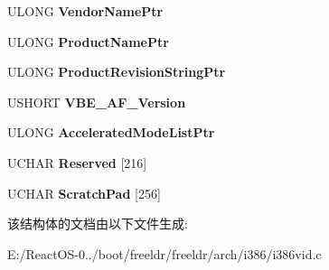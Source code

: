 \begin{DoxyCompactItemize}
U\+L\+O\+NG {\bfseries Vendor\+Name\+Ptr}
\item 
\mbox{\label{struct_v_e_s_a___s_v_g_a___i_n_f_o_a409ed8ea513bbc0b878110227179ca5a}} 
U\+L\+O\+NG {\bfseries Product\+Name\+Ptr}
\item 
\mbox{\label{struct_v_e_s_a___s_v_g_a___i_n_f_o_adc4ea70f803de7b9421195849538f61c}} 
U\+L\+O\+NG {\bfseries Product\+Revision\+String\+Ptr}
\item 
\mbox{\label{struct_v_e_s_a___s_v_g_a___i_n_f_o_aedd8337fd095075eb9fca0eaed47a026}} 
U\+S\+H\+O\+RT {\bfseries V\+B\+E\+\_\+\+A\+F\+\_\+\+Version}
\item 
\mbox{\label{struct_v_e_s_a___s_v_g_a___i_n_f_o_aec060630f54411dbb6032bff34982b80}} 
U\+L\+O\+NG {\bfseries Accelerated\+Mode\+List\+Ptr}
\item 
\mbox{\label{struct_v_e_s_a___s_v_g_a___i_n_f_o_a66057c729157594b381264e78da19150}} 
U\+C\+H\+AR {\bfseries Reserved} \mbox{[}216\mbox{]}
\item 
\mbox{\label{struct_v_e_s_a___s_v_g_a___i_n_f_o_a3df227b68fee5859ff5fe90728a1b980}} 
U\+C\+H\+AR {\bfseries Scratch\+Pad} \mbox{[}256\mbox{]}
\end{DoxyCompactItemize}


该结构体的文档由以下文件生成\+:\begin{DoxyCompactItemize}
\item 
E\+:/\+React\+O\+S-\/0../boot/freeldr/freeldr/arch/i386/i386vid.\+c\end{DoxyCompactItemize}

